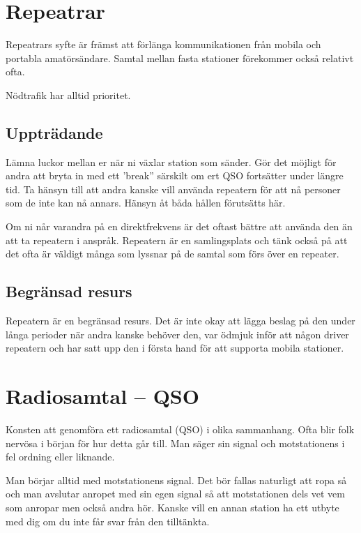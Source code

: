 \section{Repeatrar}

Repeatrars syfte är främst att förlänga kommunikationen från mobila och
portabla amatörsändare. Samtal mellan fasta stationer förekommer också
relativt ofta.

Nödtrafik har alltid prioritet.

\subsection{Uppträdande}

Lämna luckor mellan er när ni växlar station som sänder. Gör det möjligt för
andra att bryta in med ett 'break'' särskilt om ert QSO fortsätter under
längre tid. Ta hänsyn till att andra kanske vill använda repeatern för att nå
personer som de inte kan nå annars. Hänsyn åt båda hållen förutsätts här.

Om ni når varandra på en direktfrekvens är det oftast bättre att använda den
än att ta repeatern i anspråk. Repeatern är en samlingsplats och tänk också på
att det ofta är väldigt många som lyssnar på de samtal som förs över en
repeater.

\subsection{Begränsad resurs}

Repeatern är en begränsad resurs. Det är inte okay att lägga beslag på den
under långa perioder när andra kanske behöver den, var ödmjuk inför att någon
driver repeatern och har satt upp den i första hand för att supporta mobila
stationer.

\section{Radiosamtal -- QSO}

Konsten att genomföra ett radiosamtal (QSO) i olika sammanhang. Ofta blir folk
nervösa i början för hur detta går till. Man säger sin signal och motstationens
i fel ordning eller liknande.

Man börjar alltid med motstationens signal. Det bör fallas naturligt att ropa så
och man avslutar anropet med sin egen signal så att motstationen dels vet vem
som anropar men också andra hör. Kanske vill en annan station ha ett utbyte med
dig om du inte får svar från den tilltänkta.

